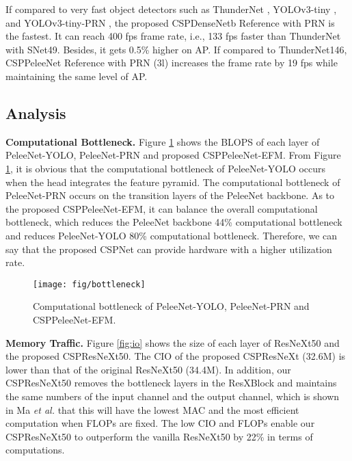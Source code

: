 \documentclass{article}
\begin{document}
If compared to very fast object detectors such as ThunderNet \cite{qin2019thundernet}, YOLOv3-tiny \cite{redmon2018yolov3}, and YOLOv3-tiny-PRN \cite{wang2019enriching}, the proposed CSPDenseNetb Reference with PRN is the fastest.  It can reach 400 fps frame rate, i.e., 133 fps faster than ThunderNet with SNet49.  Besides, it gets 0.5\% higher on AP.  If compared to ThunderNet146, CSPPeleeNet Reference with PRN (3l) increases the frame rate by 19 fps while maintaining the same level of AP.

\subsection{Analysis}

{\bf Computational Bottleneck.} Figure \ref{fig:bottleneck} shows the BLOPS of each layer of PeleeNet-YOLO, PeleeNet-PRN and proposed CSPPeleeNet-EFM.  From Figure \ref{fig:bottleneck}, it is obvious that the computational bottleneck of PeleeNet-YOLO occurs when the head integrates the feature pyramid.  The computational bottleneck of PeleeNet-PRN occurs on the transition layers of the PeleeNet backbone.  As to the proposed CSPPeleeNet-EFM, it can balance the overall computational bottleneck, which reduces the PeleeNet backbone 44\% computational bottleneck and reduces PeleeNet-YOLO 80\% computational bottleneck.  Therefore, we can say that the proposed CSPNet can provide hardware with a higher utilization rate.

\vspace*{1mm}

\begin{figure}[h]
	\begin{center}
		\texttt{[image: fig/bottleneck]}
	\end{center}
	\caption{Computational bottleneck of PeleeNet-YOLO, PeleeNet-PRN and CSPPeleeNet-EFM. }
	\label{fig:bottleneck}
\end{figure}



{\bf Memory Traffic.} Figure \ref{fig:io} shows the size of each layer of ResNeXt50 and the proposed CSPResNeXt50.  The CIO of the proposed CSPResNeXt (32.6M) is lower than that of the original ResNeXt50 (34.4M). In addition, our CSPResNeXt50 removes the bottleneck layers in the ResXBlock and maintains the same numbers of the input channel and the output channel, which is shown in Ma \textit{et al.} \cite{ma2018shufflenetv2} that this will have the lowest MAC and the most efficient computation when FLOPs are fixed. The low CIO and FLOPs enable our CSPResNeXt50 to outperform the vanilla ResNeXt50 by 22\% in terms of computations.
\end{document}
